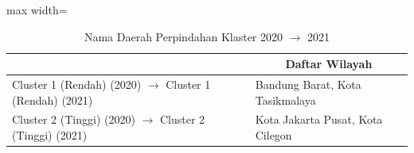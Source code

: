 \begin{table}[H]
\centering
\caption{Nama Daerah Perpindahan Klaster 2020 \(\rightarrow\) 2021} \label{tab:sample2transname2020x2021}
\begin{adjustbox}{max width=\textwidth}
\begin{tabular}{|>{\centering\arraybackslash}p{4cm}|p{10cm}|}
\hline
\multicolumn{1}{|c|}{\textbf{Kategori}} & \multicolumn{1}{c|}{\textbf{Daftar Wilayah}} \\
\hline
Cluster 1 (Rendah) (2020) \(\rightarrow\) Cluster 1 (Rendah) (2021) & Bandung Barat, Kota Tasikmalaya \\
\hline
Cluster 2 (Tinggi) (2020) \(\rightarrow\) Cluster 2 (Tinggi) (2021) & Kota Jakarta Pusat, Kota Cilegon \\
\hline
\end{tabular}
\end{adjustbox}
\end{table}